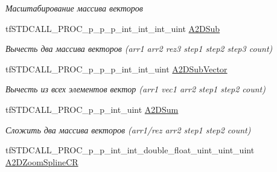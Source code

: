 \begin{DoxyCompactItemize}
\begin{DoxyCompactList}\small\item\em Масштабирование массива векторов \end{DoxyCompactList}\item 
\hypertarget{structs_functions_array_vector_c_p_u_a5d70545478ccd86d37f395571cdd15b4}{tf\-S\-T\-D\-C\-A\-L\-L\-\_\-\-P\-R\-O\-C\-\_\-p\-\_\-p\-\_\-p\-\_\-int\-\_\-int\-\_\-int\-\_\-uint \hyperlink{structs_functions_array_vector_c_p_u_a5d70545478ccd86d37f395571cdd15b4}{A2\-D\-Sub}}\label{structs_functions_array_vector_c_p_u_a5d70545478ccd86d37f395571cdd15b4}

\begin{DoxyCompactList}\small\item\em Вычесть два массива векторов (arr1 arr2 rez3 step1 step2 step3 count) \end{DoxyCompactList}\item 
\hypertarget{structs_functions_array_vector_c_p_u_acab9845a5fc3b6821c5cb7b782a85586}{tf\-S\-T\-D\-C\-A\-L\-L\-\_\-\-P\-R\-O\-C\-\_\-p\-\_\-p\-\_\-p\-\_\-int\-\_\-int\-\_\-uint \hyperlink{structs_functions_array_vector_c_p_u_acab9845a5fc3b6821c5cb7b782a85586}{A2\-D\-Sub\-Vector}}\label{structs_functions_array_vector_c_p_u_acab9845a5fc3b6821c5cb7b782a85586}

\begin{DoxyCompactList}\small\item\em Вычесть из всех элементов вектор (arr1 vec1 arr2 step1 step2 count) \end{DoxyCompactList}\item 
\hypertarget{structs_functions_array_vector_c_p_u_a9b741408bc604a427130cf69e5ddee87}{tf\-S\-T\-D\-C\-A\-L\-L\-\_\-\-P\-R\-O\-C\-\_\-p\-\_\-p\-\_\-int\-\_\-uint \hyperlink{structs_functions_array_vector_c_p_u_a9b741408bc604a427130cf69e5ddee87}{A2\-D\-Sum}}\label{structs_functions_array_vector_c_p_u_a9b741408bc604a427130cf69e5ddee87}

\begin{DoxyCompactList}\small\item\em Сложить два массива векторов (arr1/rez arr2 step1 step2 count) \end{DoxyCompactList}\item 
\hypertarget{structs_functions_array_vector_c_p_u_aabb8f6ea939e5361e1f20e5afabbb86c}{tf\-S\-T\-D\-C\-A\-L\-L\-\_\-\-P\-R\-O\-C\-\_\-p\-\_\-p\-\_\-int\-\_\-int\-\_\-double\-\_\-float\-\_\-uint\-\_\-uint\-\_\-uint \hyperlink{structs_functions_array_vector_c_p_u_aabb8f6ea939e5361e1f20e5afabbb86c}{A2\-D\-Zoom\-Spline\-C\-R}}\label{structs_functions_array_vector_c_p_u_aabb8f6ea939e5361e1f20e5afabbb86c}


\end{DoxyCompactItemize}
